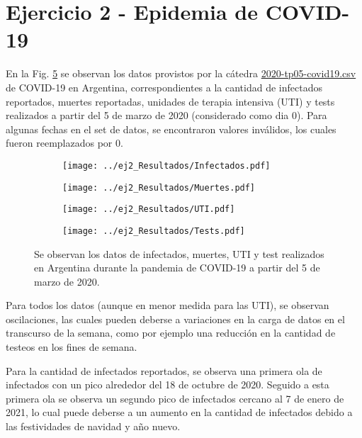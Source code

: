 \section*{Ejercicio 2 - Epidemia de COVID-19}

En la Fig. \ref{ej2:Datos} se observan los datos provistos por la cátedra \href{https://drive.google.com/file/d/1vtyItbk4Nuv7aKSKs6NnnTxVTsDfInf_/view?usp=sharing}{2020-tp05-covid19.csv} de COVID-19 en Argentina, correspondientes a la cantidad de infectados reportados, muertes reportadas, unidades de terapia intensiva (UTI) y tests realizados a partir del 5 de marzo de 2020 (considerado como dia 0). Para algunas fechas en el set de datos, se encontraron valores inválidos, los cuales fueron reemplazados por 0.

\begin{figure}[htb!]
    \centering
    \begin{subfigure}[b]{0.48\textwidth}
        \texttt{[image: ../ej2\_Resultados/Infectados.pdf]}
        \label{ej2:infectados}
    \end{subfigure}
    \hfill
    \begin{subfigure}[b]{0.48\textwidth}
        \texttt{[image: ../ej2\_Resultados/Muertes.pdf]}
        \label{ej2:muertes}
    \end{subfigure}
    \hfill
    \begin{subfigure}[b]{0.48\textwidth}
        \texttt{[image: ../ej2\_Resultados/UTI.pdf]}
        \label{ej2:UTI}
    \end{subfigure}
    \begin{subfigure}[b]{0.48\textwidth}
        \texttt{[image: ../ej2\_Resultados/Tests.pdf]}
        \label{ej2:Tests}
    \end{subfigure}
    \caption{Se observan los datos de infectados, muertes, UTI y test realizados en Argentina durante la pandemia de COVID-19 a partir del 5 de marzo de 2020.}
    \label{ej2:Datos}
\end{figure}

Para todos los datos (aunque en menor medida para las UTI), se observan oscilaciones, las cuales pueden deberse a variaciones en la carga de datos en el transcurso de la semana, como por ejemplo una reducción en la cantidad de testeos en los fines de semana.

Para la cantidad de infectados reportados, se observa una primera ola de infectados con un pico alrededor del 18 de octubre de 2020. Seguido a esta primera ola se observa un segundo pico de infectados cercano al 7 de enero de 2021, lo cual puede deberse a un aumento en la cantidad de infectados debido a las festividades de navidad y año nuevo.

